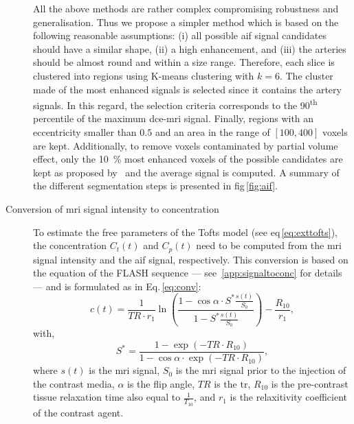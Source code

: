 \begin{description}
    All the above methods are rather complex compromising robustness and generalisation.
    Thus we propose a simpler method which is based on the following reasonable assumptions:
    (i) all possible \ac{aif} signal candidates should have a similar shape,
    (ii) a high enhancement, and
    (iii) the arteries should be almost round and within a size range.
    Therefore, each slice is clustered into regions using K-means clustering with $k=6$.
    The cluster made of the most enhanced signals is selected since it contains the artery signals.
    In this regard, the selection criteria corresponds to the 90\textsuperscript{th} percentile of the maximum \ac{dce}-\ac{mri} signal.
    Finally, regions with an eccentricity smaller than $0.5$ and an area in the range of $[100, 400]$ voxels are kept.
    Additionally, to remove voxels contaminated by partial volume effect, only the \SI{10}{\percent} most enhanced voxels of the possible candidates are kept as proposed by~\cite{schabel2008uncertainty} and the average signal is computed.
    A summary of the different segmentation steps is presented in \acs{fig}\,\ref{fig:aif}.
    \item[Conversion of \ac{mri} signal intensity to concentration] To estimate the free parameters of the Tofts model (see \acs{eq}\,\eqref{eq:exttofts}), the concentration $C_t(t)$ and $C_p(t)$ need to be computed from the \ac{mri} signal intensity and the \ac{aif} signal, respectively.
      This conversion is based on the equation of the FLASH sequence --- see~\ref{app:signaltoconc} for details --- and is formulated as in Eq.\,\eqref{eq:conv}:
      \begin{equation}
        c(t) = \frac{1}{TR \cdot r_1} \ln\left( \frac{1 - \cos \alpha \cdot S^{*}\frac{s(t)}{S_0}}{1 - S^{*}\frac{s(t)}{S_0}} \right) - \frac{R_{10}}{r_1} ,
        \label{eq:conv}
      \end{equation}
      \noindent with,
      \begin{equation}
        S^{*} = \frac{1 - \exp(- TR \cdot R_{10})}{1 - \cos \alpha \cdot \exp(- TR \cdot R_{10})} ,
        \label{eq:sstarconv}
      \end{equation}
      \noindent where $s(t)$ is the \ac{mri} signal, $S_0$ is the \ac{mri} signal prior to the injection of the contrast media, $\alpha$ is the flip angle, $TR$ is the \acf{tr}, $R_{10}$ is the pre-contrast tissue relaxation time also equal to $\frac{1}{T_{10}}$, and $r_1$ is the relaxitivity coefficient of the contrast agent.


\end{description}

